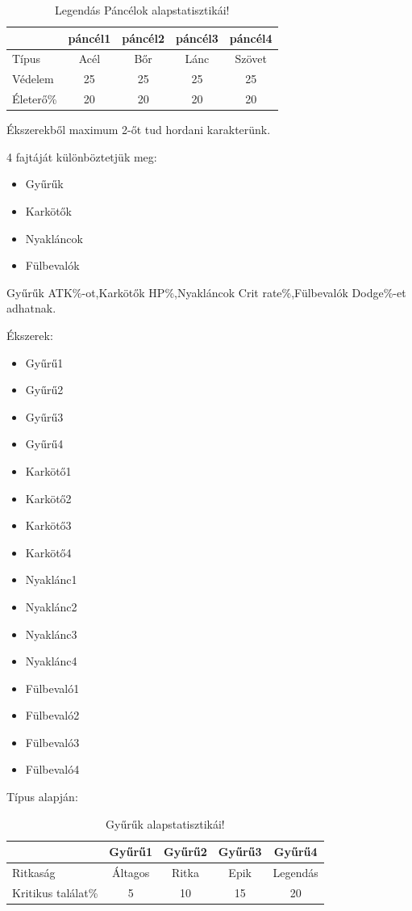 \begin{table}[h]
\centering
\caption{Legendás Páncélok alapstatisztikái!}
\label{tab:minta}
\begin{tabular}{|l|c|c|c|c|}
\hline
 & páncél1 & páncél2 & páncél3 & páncél4  \\
\hline
Típus & Acél & Bőr & Lánc & Szövet\\
\hline
Védelem & 25 & 25 & 25 & 25 \\
\hline
Életerő\% & 20 & 20 & 20 & 20 \\
\hline
\end{tabular}
\end{table}

\newpage
\noindent Ékszerekből maximum 2-őt tud hordani karakterünk.

4 fajtáját különböztetjük meg:

\begin{itemize}
  \item Gyűrűk
  \item Karkötők
  \item Nyakláncok
  \item Fülbevalók
\end{itemize}

\noindent Gyűrűk ATK\%-ot,Karkötők HP\%,Nyakláncok Crit rate\%,Fülbevalók Dodge\%-et adhatnak.

Ékszerek:

\begin{itemize}
 \item Gyűrű1
 \item Gyűrű2
 \item Gyűrű3
 \item Gyűrű4
 \item Karkötő1
 \item Karkötő2
 \item Karkötő3
 \item Karkötő4
 \item Nyaklánc1
 \item Nyaklánc2
 \item Nyaklánc3
 \item Nyaklánc4
 \item Fülbevaló1
 \item Fülbevaló2
 \item Fülbevaló3
 \item Fülbevaló4
\end{itemize}
\newpage
Típus alapján:

\begin{table}[h]
\centering
\caption{Gyűrűk alapstatisztikái!}
\label{tab:minta}
\begin{tabular}{|l|c|c|c|c|}
\hline
 & Gyűrű1 & Gyűrű2 & Gyűrű3 & Gyűrű4  \\
\hline
Ritkaság & Áltagos & Ritka & Epik & Legendás\\
\hline
Kritikus találat\% & 5 & 10 & 15 & 20 \\
\hline
\end{tabular}
\end{table}

